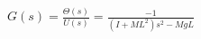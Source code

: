 \documentclass[preview]{standalone}
\begin{document}
\begin{align*}
G(s) = \frac{\Theta(s)}{U(s)} = \frac{-1}{(I+ML^2)s^2 - MgL}
\end{align*}
\end{document}
